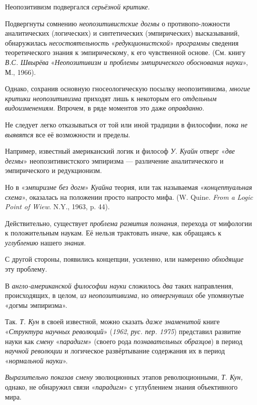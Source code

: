 \documentclass[a4paper,14pt,russian]{extreport}
\begin{document}
Неопозитивизм подвергался \emph{серьёзной критике}.

Подвергнуты сомнению \emph{неопозитивистские догмы} о противопо-ложности аналитических (логических) и синтетических (эмпирических) высказываний, обнаружилась \emph{несостоятельность} «\emph{редукционистской}» \emph{программы} сведения теоретического знания к эмпирическому, к его чувственной основе. (См. книгу \emph{В.С. Швырёва} «\emph{Неопозитивизм и проблемы эмпирического обоснования науки}», М., 1966).

Однако, сохранив основную гносеологическую посылку неопозитивизма, \emph{многие критики неопозитивизма} приходят лишь к некоторым его \emph{отдельным видоизменениям}. Впрочем, в ряде моментов это даже \emph{оправданно}.

Не следует легко отказываться от той или иной традиции в философии, \emph{пока не выявятся} все её возможности и пределы.

Например, известный американский логик и философ \emph{У. Куайн} отверг «\emph{две дегмы}» неопозитивистского эмпиризма --- различение аналитического и эмпирического и редукционизм.

Но в «\emph{эмпиризме без догм}» \emph{Куайна} теория, или так называемая «\emph{концептуальная схема}», оказалась на положении просто напросто мифа. (W. Quine. \emph{From a Logic Point of Wiew}. N.Y., 1963, p. 44).

Действительно, существует \emph{проблема развития познания}, перехода от мифологии к положительным наукам. Её нельзя трактовать иначе, как обращаясь к \emph{углублению} нашего \emph{знания}.

С другой стороны, появились концепции, усиленно, или намеренно \emph{обходящие} эту проблему.

В \emph{англо-американской философии науки} сложилось \emph{два} таких направления, происходящих, в целом, \emph{из неопозитивизма}, но \emph{отвергнувших} обе упомянутые «догмы эмпиризма».

Так. \emph{Т. Кун} в своей известной, можно сказать \emph{даже знаменитой} книге «\emph{Структура научных революций}» (\emph{1962}, \emph{рус. пер. 1975}) представил развитие науки как \emph{смену} «\emph{парадигм}» (своего рода \emph{познавательных образцов}) в период \emph{научной революции} и логическое развёртывание содержания их в период «\emph{нормальной науки}».

\emph{Выразительно показав смену} эволюционных этапов революционными, \emph{Т. Кун,} однако, не обнаружил связи «\emph{парадигм}» с углублением знания объективного мира.
\end{document}
